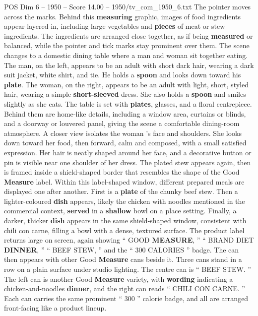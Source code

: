 \begin{textsample}{POS Dim 6 – 1950 – Score 14.00 – 1950/tv\_com\_1950\_6.txt}
The pointer moves across the marks.
Behind this \textbf{measuring} graphic, images of food ingredients appear layered in, including large vegetables and \textbf{pieces} of meat or stew ingredients.
The ingredients are arranged close together, as if being \textbf{measured} or balanced, while the pointer and tick marks stay prominent over them.
The scene changes to a domestic dining table where a man and woman sit together eating.
The man, on the left, appears to be an adult with short dark hair, wearing a dark suit jacket, white shirt, and tie.
He holds a \textbf{spoon} and looks down toward his \textbf{plate}.
The woman, on the right, appears to be an adult with light, short, styled hair, wearing a simple \textbf{short-sleeved} dress.
She also holds a \textbf{spoon} and smiles slightly as she eats.
The table is set with \textbf{plates}, glasses, and a floral centrepiece.
Behind them are home-like details, including a window area, curtains or blinds, and a doorway or louvered panel, giving the scene a comfortable dining-room atmosphere.
A closer view isolates the woman ’s face and shoulders.
She looks down toward her food, then forward, calm and composed, with a small satisfied expression.
Her hair is neatly shaped around her face, and a decorative button or pin is visible near one shoulder of her dress.
The plated stew appears again, then is framed inside a shield-shaped border that resembles the shape of the Good \textbf{Measure} label.
Within this label-shaped window, different prepared meals are displayed one after another.
First is a \textbf{plate} of the chunky beef stew.
Then a lighter-coloured \textbf{dish} appears, likely the chicken with noodles mentioned in the commercial context, \textbf{served} in a \textbf{shallow} bowl on a place setting.
Finally, a darker, thicker \textbf{dish} appears in the same shield-shaped window, consistent with chili con carne, filling a bowl with a dense, textured surface.
The product label returns large on screen, again showing “ GOOD \textbf{MEASURE}, ” “ BRAND DIET \textbf{DINNER}, ” “ BEEF STEW, ” and the “ 300 CALORIES ” badge.
The can then appears with other Good \textbf{Measure} cans beside it.
Three cans stand in a row on a plain surface under studio lighting.
The centre can is “ BEEF STEW. ” The left can is another Good \textbf{Measure} variety, with \textbf{wording} indicating a chicken-and-noodles \textbf{dinner}, and the right can reads “ CHILI CON CARNE. ” Each can carries the same prominent “ 300 ” calorie badge, and all are arranged front-facing like a product lineup.

\end{textsample}

